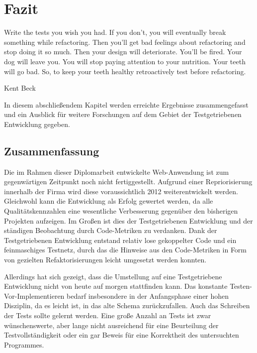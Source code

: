 \chapter{Fazit}
\label{sec:fazit}
\epigraph{Write the tests you wish you had. If you don't, you will eventually break something while refactoring. Then you'll get bad feelings about refactoring and stop doing it so much. Then your design will deteriorate. You'll be fired. Your dog will leave you. You will stop paying attention to your nutrition. Your teeth will go bad. So, to keep your teeth healthy retroactively test before refactoring.}{Kent Beck \citep{beck_test_2002}}

In diesem abschließendem Kapitel werden erreichte Ergebnisse zusammengefasst und ein Ausblick für weitere Forschungen auf dem Gebiet der Testgetriebenen Entwicklung gegeben.

\section{Zusammenfassung}



Die im Rahmen dieser Diplomarbeit entwickelte Web-Anwendung ist zum gegenwärtigen Zeitpunkt noch nicht fertiggestellt. Aufgrund einer Repriorisierung innerhalb der Firma wird diese voraussichtlich 2012 weiterentwickelt werden. Gleichwohl kann die Entwicklung als Erfolg gewertet werden, da alle Qualitätskennzahlen eine wesentliche Verbesserung gegenüber den bisherigen Projekten aufzeigen. Im Großen ist dies der Testgetriebenen Entwicklung und der ständigen Beobachtung durch Code-Metriken zu verdanken. Dank der Testgetriebenen Entwicklung entstand relativ lose gekoppelter Code und ein feinmaschiges Testnetz, durch das die Hinweise aus den Code-Metriken in Form von gezielten Refaktorisierungen leicht umgesetzt werden konnten.

Allerdings hat sich gezeigt, dass die Umstellung auf eine Testgetriebene Entwicklung nicht von heute auf morgen stattfinden kann. Das konstante Testen-Vor\hyp{}Implementieren bedarf insbesondere in der Anfangsphase einer hohen Disziplin, da es leicht ist, in das alte Schema zurückzufallen. Auch das Schreiben der Tests sollte gelernt werden. Eine große Anzahl an Tests ist zwar wünschenswerte, aber lange nicht ausreichend für eine Beurteilung der Testvollständigkeit oder ein gar Beweis für eine Korrektheit des untersuchten Programmes.

